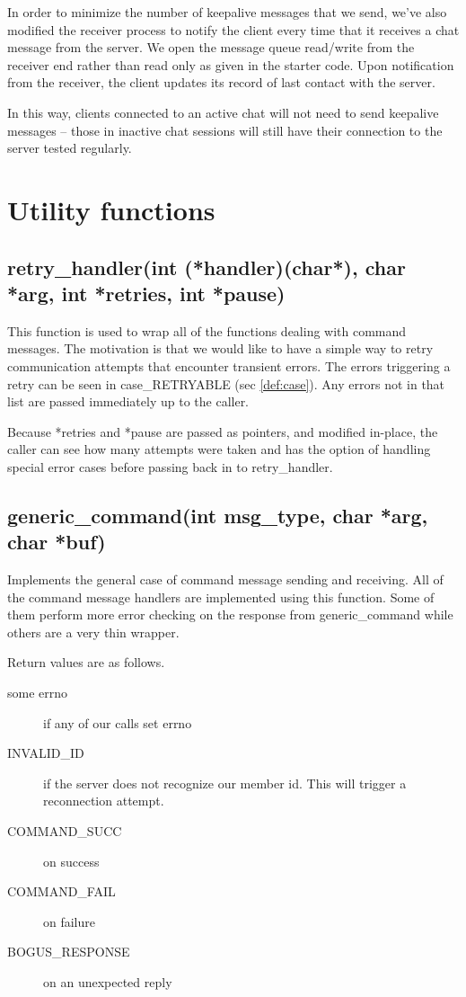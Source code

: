 \documentclass{article}
\begin{document}
In order to minimize the number of keepalive messages that we send, we've
also modified the receiver process to notify the client every time that it
receives a chat message from the server. We open the message queue read/write
from the receiver end rather than read only as given in the starter code.
Upon notification from the receiver, the client updates its record of last
contact with the server.

In this way, clients connected to an active chat will not need to send 
keepalive messages -- those in inactive chat sessions will still have their
connection to the server tested regularly.

\section{Utility functions}
\subsection{retry\_handler(int (*handler)(char*), char *arg, int *retries, int *pause)}
\label{func:retry}
This function is used to wrap all of the functions dealing with command
messages. The motivation is that we would like to have a simple way to 
retry communication attempts that encounter transient errors. The errors
triggering a retry can be seen in case\_RETRYABLE (sec \ref{def:case}).
Any errors not in that list are passed immediately up to the caller.

Because *retries and *pause are passed as pointers, and modified in-place,
the caller can see
how many attempts were taken and has the option of handling special error
cases before passing back in to retry\_handler.

\subsection{generic\_command(int msg\_type, char *arg, char *buf)}
Implements the general case of command message sending and receiving. All of
the command message handlers are implemented using this function. Some of
them perform more error checking on the response from generic\_command while
others are a very thin wrapper.

Return values are as follows.
\begin{description}
    \item[some errno] if any of our calls set errno
    \item[INVALID\_ID] if the server does not recognize our member id. This
    will trigger a reconnection attempt.
    \item[COMMAND\_SUCC] on success
    \item[COMMAND\_FAIL] on failure
    \item[BOGUS\_RESPONSE] on an unexpected reply
\end{description}
\end{document}
